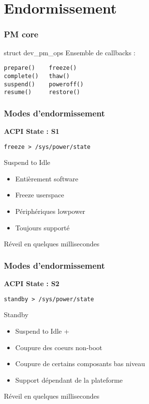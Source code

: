 \section{Endormissement}

\begin{frame}[fragile]
	\frametitle{PM core}
	\begin{block}{struct dev\_pm\_ops}
Ensemble de callbacks : 

\begin{verbatim}
prepare()    freeze()
complete()   thaw()
suspend()    poweroff()
resume()     restore()
\end{verbatim}
	\end{block}
\end{frame}
\begin{frame}
	\frametitle{Modes d'endormissement}
	\textbf{ACPI State : S1}

	\texttt{freeze > /sys/power/state}
	\begin{block}{Suspend to Idle}
		\begin{itemize}
			\item Entièrement software
			\item Freeze userspace
			\item Périphériques lowpower
			\item Toujours supporté
		\end{itemize}
	\end{block}
	Réveil en quelques millisecondes
\end{frame}
\begin{frame}
	\frametitle{Modes d'endormissement}
	\textbf{ACPI State : S2}

	\texttt{standby > /sys/power/state}
	\begin{block}{Standby}
		\begin{itemize}
			\item Suspend to Idle +
			\item Coupure des coeurs non-boot
			\item Coupure de certains composants bas niveau
			\item Support dépendant de la plateforme
		\end{itemize}
	\end{block}
	Réveil en quelques millisecondes
\end{frame}

